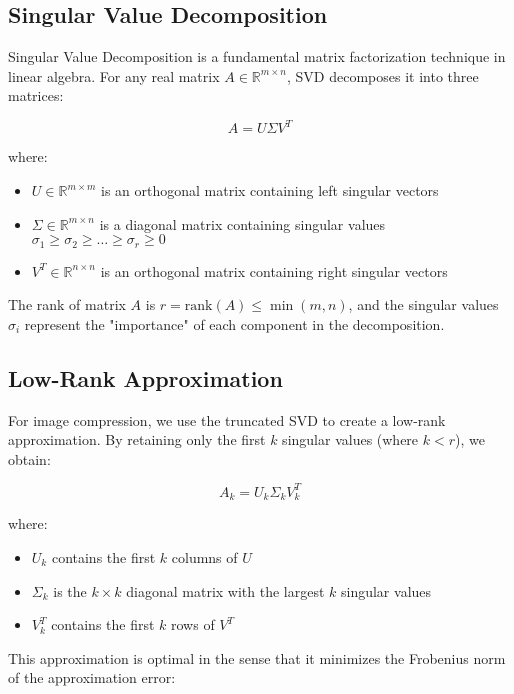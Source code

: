 \documentclass[12pt,a4paper]{article}
\begin{document}
\subsection{Singular Value Decomposition}

Singular Value Decomposition is a fundamental matrix factorization technique in linear algebra. For any real matrix $A \in \mathbb{R}^{m \times n}$, SVD decomposes it into three matrices:

\begin{equation}
A = U\Sigma V^T
\end{equation}

where:
\begin{itemize}
    \item $U \in \mathbb{R}^{m \times m}$ is an orthogonal matrix containing left singular vectors
    \item $\Sigma \in \mathbb{R}^{m \times n}$ is a diagonal matrix containing singular values $\sigma_1 \geq \sigma_2 \geq \ldots \geq \sigma_r \geq 0$
    \item $V^T \in \mathbb{R}^{n \times n}$ is an orthogonal matrix containing right singular vectors
\end{itemize}

The rank of matrix $A$ is $r = \text{rank}(A) \leq \min(m,n)$, and the singular values $\sigma_i$ represent the "importance" of each component in the decomposition.

\subsection{Low-Rank Approximation}

For image compression, we use the truncated SVD to create a low-rank approximation. By retaining only the first $k$ singular values (where $k < r$), we obtain:

\begin{equation}
A_k = U_k\Sigma_k V_k^T
\end{equation}

where:
\begin{itemize}
    \item $U_k$ contains the first $k$ columns of $U$
    \item $\Sigma_k$ is the $k \times k$ diagonal matrix with the largest $k$ singular values
    \item $V_k^T$ contains the first $k$ rows of $V^T$
\end{itemize}

This approximation is optimal in the sense that it minimizes the Frobenius norm of the approximation error:
\end{document}
